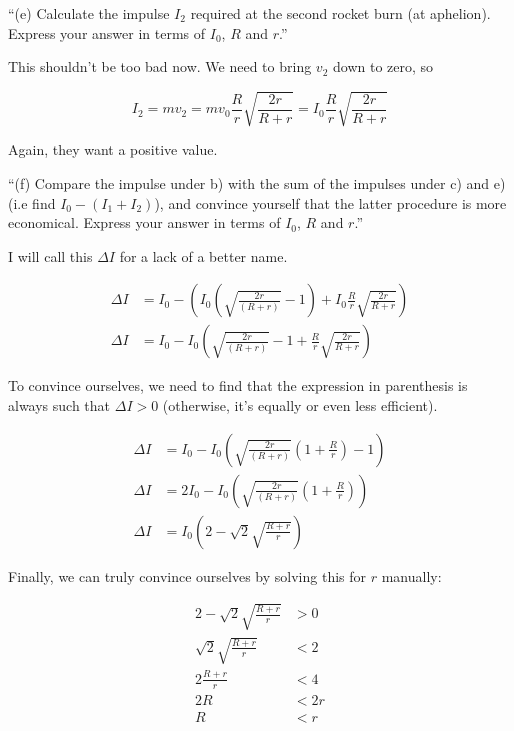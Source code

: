 \documentclass[8.01x]{subfiles}
\begin{document}
``(e) Calculate the impulse $I_2$ required at the second rocket burn (at aphelion). Express your answer in terms of $I_0$, $R$ and $r$.''

This shouldn't be too bad now. We need to bring $v_2$ down to zero, so

\begin{equation}
I_2 = m v_2 = m v_0 \frac{R}{r} \sqrt{\frac{2r}{R + r}} = I_0 \frac{R}{r} \sqrt{\frac{2r}{R + r}}
\end{equation}

Again, they want a positive value.

``(f) Compare the impulse under b) with the sum of the impulses under c) and e) (i.e find $I_0 - (I_1 + I_2)$), and convince yourself that the latter procedure is more economical. Express your answer in terms of $I_0$, $R$ and $r$.''

I will call this $\Delta I$ for a lack of a better name.

\begin{align}
\Delta I &= I_0 - \left( I_0 \left(\sqrt{\frac{2 r}{(R + r)}} - 1\right) + I_0 \frac{R}{r} \sqrt{\frac{2r}{R + r}} \right)\\
\Delta I &= I_0 - I_0 \left( \sqrt{\frac{2 r}{(R + r)}} - 1 + \frac{R}{r} \sqrt{\frac{2r}{R + r}} \right)
\end{align}

To convince ourselves, we need to find that the expression in parenthesis is always such that $\Delta I > 0$ (otherwise, it's equally or even less efficient).

\begin{align}
\Delta I &= I_0 - I_0 \left( \sqrt{\frac{2 r}{(R + r)}} \left(1 + \frac{R}{r}\right) - 1 \right)\\
\Delta I &= 2 I_0 - I_0 \left( \sqrt{\frac{2 r}{(R + r)}} \left(1 + \frac{R}{r}\right) \right)\\
\Delta I &= I_0\left( 2 - \sqrt{2} \sqrt{\frac{R+r}{r}} \right)
\end{align}

Finally, we can truly convince ourselves by solving this for $r$ manually:

\begin{align}
2 - \sqrt{2} \sqrt{\frac{R+r}{r}} &> 0\\
\sqrt{2} \sqrt{\frac{R+r}{r}} &< 2\\
2 \frac{R+r}{r} &< 4\\
2 R &< 2r\\
R &< r
\end{align}
\end{document}
